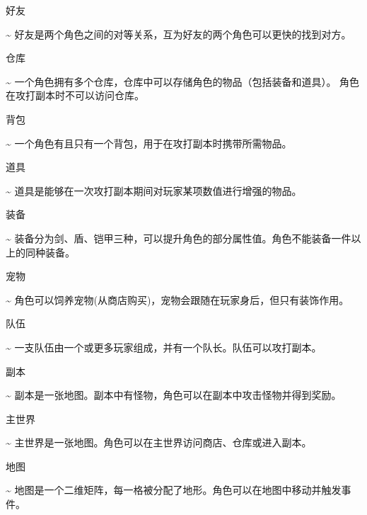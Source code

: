 \documentclass{article}
\begin{document}
 好友%

  \textasciitilde{} 好友是两个角色之间的对等关系，互为好友的两个角色可以更快的找到对方。%

 仓库%

  \textasciitilde{} 一个角色拥有多个仓库，仓库中可以存储角色的物品（包括装备和道具）。 角色在攻打副本时不可以访问仓库。%

 背包%

  \textasciitilde{} 一个角色有且只有一个背包，用于在攻打副本时携带所需物品。%

 道具%

  \textasciitilde{} 道具是能够在一次攻打副本期间对玩家某项数值进行增强的物品。%

 装备%

  \textasciitilde{} 装备分为剑、盾、铠甲三种，可以提升角色的部分属性值。角色不能装备一件以上的同种装备。%

 宠物%

  \textasciitilde{} 角色可以饲养宠物(从商店购买)，宠物会跟随在玩家身后，但只有装饰作用。%

 队伍%

  \textasciitilde{} 一支队伍由一个或更多玩家组成，并有一个队长。队伍可以攻打副本。%

 副本%

  \textasciitilde{} 副本是一张地图。副本中有怪物，角色可以在副本中攻击怪物并得到奖励。%

 主世界%

  \textasciitilde{} 主世界是一张地图。角色可以在主世界访问商店、仓库或进入副本。%

 地图%

  \textasciitilde{} 地图是一个二维矩阵，每一格被分配了地形。角色可以在地图中移动并触发事件。%
\end{document}
